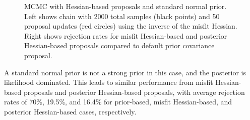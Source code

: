 \begin{figure}[htbp]
  \begin{subfigmatrix}{2}
  \end{subfigmatrix}
  \caption{MCMC with Hessian-based proposals and standard normal prior. Left shows chain with 2000 total samples (black points) and 50 proposal updates (red circles) using the inverse of the misfit Hessian. Right shows rejection rates for misfit Hessian-based and posterior Hessian-based proposals compared to default prior covariance proposal.}
\label{fig:rosen_restart}
\end{figure}
A standard normal prior is not a strong prior in this case, and
the posterior is likelihood dominated.  This leads to similar
performance from misfit Hessian-based proposals and posterior
Hessian-based proposals, with average rejection rates of 70\%, 19.5\%,
and 16.4\% for prior-based, misfit Hessian-based, and posterior
Hessian-based cases, respectively.
